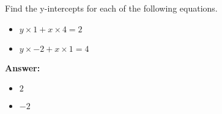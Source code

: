  Find the y-intercepts for each of the following equations. \begin{itemize}\item \( y \times 1 + x \times 4 = 2 \)\item \( y \times -2 + x \times 1 = 4 \)\end{itemize}

        \textbf{Answer:} \begin{itemize}\item \( 2 \)\item \( -2 \)\end{itemize}

